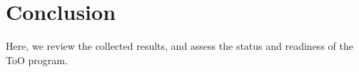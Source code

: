 \section{Conclusion}\label{sec:conclusion}

Here, we review the collected results, and assess the status and readiness of the ToO program.

\newpage